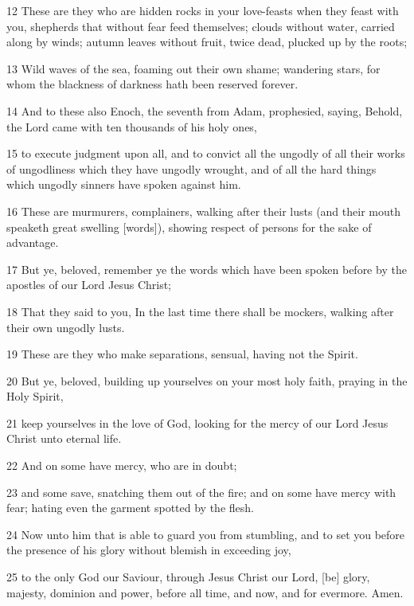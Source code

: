 \par 12 These are they who are hidden rocks in your love-feasts when they feast with you, shepherds that without fear feed themselves; clouds without water, carried along by winds; autumn leaves without fruit, twice dead, plucked up by the roots;
\par 13 Wild waves of the sea, foaming out their own shame; wandering stars, for whom the blackness of darkness hath been reserved forever.
\par 14 And to these also Enoch, the seventh from Adam, prophesied, saying, Behold, the Lord came with ten thousands of his holy ones,
\par 15 to execute judgment upon all, and to convict all the ungodly of all their works of ungodliness which they have ungodly wrought, and of all the hard things which ungodly sinners have spoken against him.
\par 16 These are murmurers, complainers, walking after their lusts (and their mouth speaketh great swelling [words]), showing respect of persons for the sake of advantage.
\par 17 But ye, beloved, remember ye the words which have been spoken before by the apostles of our Lord Jesus Christ;
\par 18 That they said to you, In the last time there shall be mockers, walking after their own ungodly lusts.
\par 19 These are they who make separations, sensual, having not the Spirit.
\par 20 But ye, beloved, building up yourselves on your most holy faith, praying in the Holy Spirit,
\par 21 keep yourselves in the love of God, looking for the mercy of our Lord Jesus Christ unto eternal life.
\par 22 And on some have mercy, who are in doubt;
\par 23 and some save, snatching them out of the fire; and on some have mercy with fear; hating even the garment spotted by the flesh.
\par 24 Now unto him that is able to guard you from stumbling, and to set you before the presence of his glory without blemish in exceeding joy,
\par 25 to the only God our Saviour, through Jesus Christ our Lord, [be] glory, majesty, dominion and power, before all time, and now, and for evermore. Amen.

